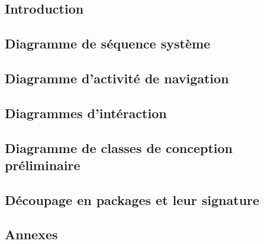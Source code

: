 \documentclass[asi]{picInsa}
\title{\DCP{}}
\author{\Florian{}, \Kafui{}, \Melissa{}, \Julie{}, \Mathieu{}} %
\begin{document}
\couverture{}

 \informationsGenerales{}


\tableofcontents

\setcounter{chapter}{0}


\chapter*{Introduction}
\label{intro}


\chapter{Diagramme de séquence système}
\label{diagrammeSequenceSysteme}


\chapter{Diagramme d'activité de navigation}
\label{diagrammeNavigation}


\chapter{Diagrammes d'intéraction}
\label{diagrammeInteraction}


\chapter{Diagramme de classes de conception préliminaire}
\label{diagrammeClasses}


\chapter{Découpage en packages et leur signature}
\label{diagrammePackages}


\begin{appendix}
\part*{Annexes}

\listoffigures
{}
	 
\listoftables
{}
\end{appendix}
\pageQuatriemeCouverture
\end{document}

